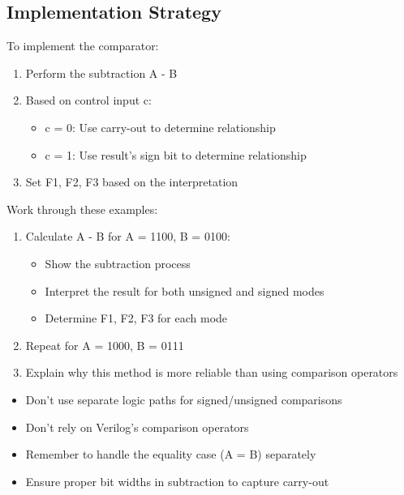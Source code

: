 \documentclass[12pt]{betterjournal}
\begin{document}
\subsection{Implementation Strategy}

To implement the comparator:
\begin{enumerate}
    \item Perform the subtraction A - B
    \item Based on control input c:
    \begin{itemize}
        \item c = 0: Use carry-out to determine relationship
        \item c = 1: Use result's sign bit to determine relationship
    \end{itemize}
    \item Set F1, F2, F3 based on the interpretation
\end{enumerate}

\begin{question}
Work through these examples:
\begin{enumerate}
    \item Calculate A - B for A = 1100, B = 0100:
    \begin{itemize}
        \item Show the subtraction process
        \item Interpret the result for both unsigned and signed modes
        \item Determine F1, F2, F3 for each mode
    \end{itemize}
    \item Repeat for A = 1000, B = 0111
    \item Explain why this method is more reliable than using comparison operators
\end{enumerate}
\end{question}

\begin{extra}[frametitle={Common Pitfalls to Avoid}]
\begin{itemize}
    \item Don't use separate logic paths for signed/unsigned comparisons
    \item Don't rely on Verilog's comparison operators
    \item Remember to handle the equality case (A = B) separately
    \item Ensure proper bit widths in subtraction to capture carry-out
\end{itemize}
\end{extra}
\end{document}
